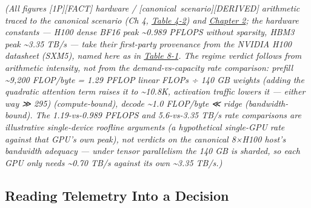 \emph{(All figures \mbox{{[}1P{]}}\hspace{0pt}\mbox{{[}FACT{]}} hardware / \mbox{{[}canonical
scenario{]}}\hspace{0pt}\mbox{{[}DERIVED{]}} arithmetic traced to the canonical scenario (Ch
4, \hyperref[tab:4.2]{Table 4-2}) and \hyperref[chap:2]{Chapter 2}; the hardware constants --- H100 dense BF16
peak \textasciitilde0.989 PFLOPS without sparsity, HBM3 peak
\textasciitilde3.35 TB/s --- take their first-party provenance from the
NVIDIA H100 datasheet (SXM5), named here as in \hyperref[tab:8.1]{Table 8-1}. The regime
verdict follows from arithmetic intensity, not from the
demand-vs-capacity rate comparison: prefill \textasciitilde9,200
FLOP/byte = 1.29 PFLOP linear FLOPs ÷ 140 GB weights (adding the
quadratic attention term raises it to \textasciitilde10.8K, activation
traffic lowers it --- either way ≫ 295) (compute-bound), decode
\textasciitilde1.0 FLOP/byte ≪ ridge (bandwidth-bound). The
1.19-vs-0.989 PFLOPS and 5.6-vs-3.35 TB/s rate comparisons are
illustrative single-device roofline arguments (a hypothetical single-GPU
rate against that GPU's own peak), not verdicts on the canonical 8×H100
host's bandwidth adequacy --- under tensor parallelism the 140 GB is
sharded, so each GPU only needs \textasciitilde0.70 TB/s against its own
\textasciitilde3.35 TB/s.)}

\subsection{Reading Telemetry Into a
Decision}\label{reading-telemetry-into-a-decision}


